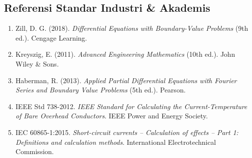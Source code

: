 \documentclass[11pt,a4paper]{article}
\theoremstyle{definition}
\begin{document}
\subsection{Referensi Standar Industri \& Akademis}
\begin{enumerate}[leftmargin=*]
    \item Zill, D. G. (2018). \textit{Differential Equations with Boundary-Value Problems} (9th ed.). Cengage Learning.
    \item Kreyszig, E. (2011). \textit{Advanced Engineering Mathematics} (10th ed.). John Wiley \& Sons.
    \item Haberman, R. (2013). \textit{Applied Partial Differential Equations with Fourier Series and Boundary Value Problems} (5th ed.). Pearson.
    \item IEEE Std 738-2012. \textit{IEEE Standard for Calculating the Current-Temperature of Bare Overhead Conductors}. IEEE Power and Energy Society.
    \item IEC 60865-1:2015. \textit{Short-circuit currents -- Calculation of effects -- Part 1: Definitions and calculation methods}. International Electrotechnical Commission.
\end{enumerate}
\end{document}
